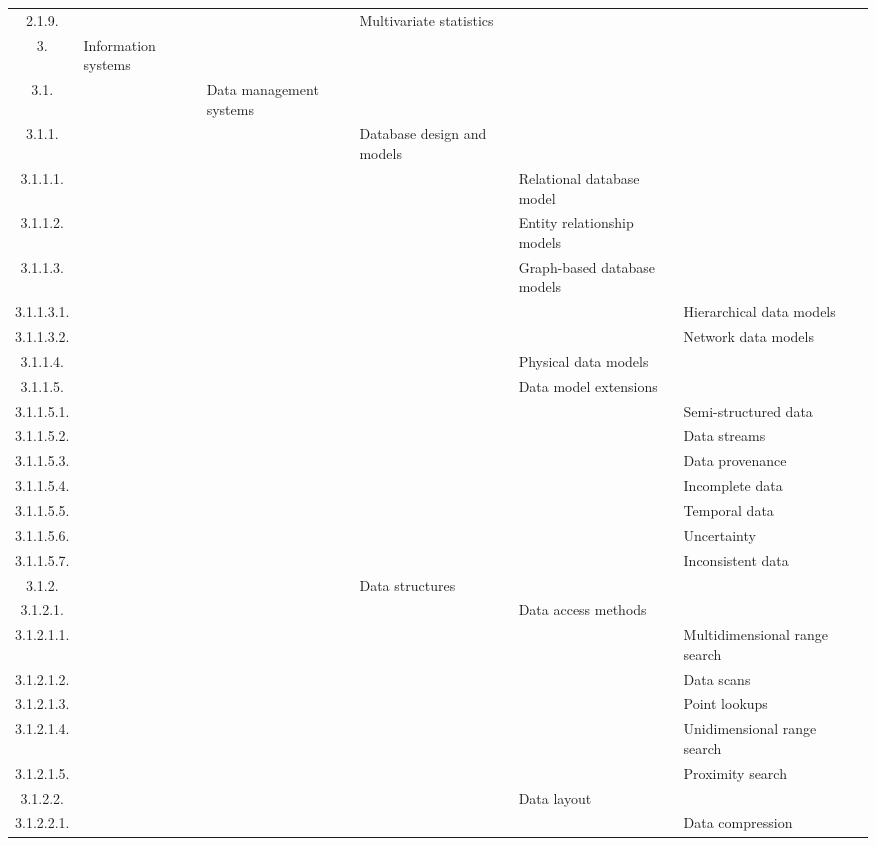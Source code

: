 \documentclass[12pt]{article}
\begin{document}
\begin{center}
{\begin{tabularx}{\linewidth}{|c|X|X|X|X|X|X|}
		2.1.9. &   &   &  Multivariate statistics &   &   &   \\
		3. &  Information systems &   &   &   &   &   \\
		3.1. &   &  Data management systems &   &   &   &   \\
		3.1.1. &   &   &  Database design and models &   &   &   \\
		3.1.1.1. &   &   &   &  Relational database model &   &   \\
		3.1.1.2. &   &   &   &  Entity relationship models &   &   \\
		3.1.1.3. &   &   &   &  Graph-based database models &   &   \\
		3.1.1.3.1. &   &   &   &   &  Hierarchical data models &   \\
		3.1.1.3.2. &   &   &   &   &  Network data models &   \\
		3.1.1.4. &   &   &   &  Physical data models &   &   \\
		3.1.1.5. &   &   &   &  Data model extensions &   &   \\
		3.1.1.5.1. &   &   &   &   &  Semi-structured data &   \\
		3.1.1.5.2. &   &   &   &   &  Data streams &   \\
		3.1.1.5.3. &   &   &   &   &  Data provenance &   \\
		3.1.1.5.4. &   &   &   &   &  Incomplete data &   \\
		3.1.1.5.5. &   &   &   &   &  Temporal data &   \\
		3.1.1.5.6. &   &   &   &   &  Uncertainty &   \\
		3.1.1.5.7. &   &   &   &   &  Inconsistent data &   \\
		3.1.2. &   &   &  Data structures &   &   &   \\
		3.1.2.1. &   &   &   &  Data access methods &   &   \\
		3.1.2.1.1. &   &   &   &   &  Multidimensional range search &   \\
		3.1.2.1.2. &   &   &   &   &  Data scans &   \\
		3.1.2.1.3. &   &   &   &   &  Point lookups &   \\
		3.1.2.1.4. &   &   &   &   &  Unidimensional range search &   \\
		3.1.2.1.5. &   &   &   &   &  Proximity search &   \\
		3.1.2.2. &   &   &   &  Data layout &   &   \\
		3.1.2.2.1. &   &   &   &   &  Data compression &   \\

\end{tabularx}}
\end{center}
\end{document}

